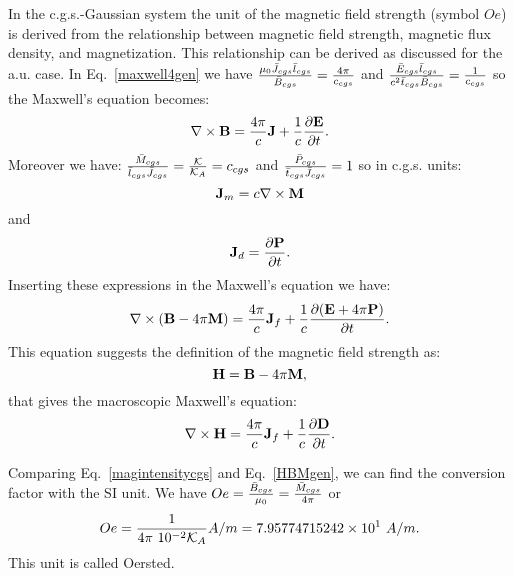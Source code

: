 \documentclass[12pt,a4paper]{article}
\def\htoh{7.95774715242\times 10^{1}}
\begin{document}
{\color{orange} In the c.g.s.-Gaussian system the unit of the magnetic field
strength (symbol $Oe$) is derived from the relationship between 
magnetic field strength,
magnetic flux density, and magnetization. This relationship can be derived
as discussed for the a.u. case. In Eq.~\ref{maxwell4gen} we have
${\mu_0 \bar J_{cgs} \bar l_{cgs} \over \bar B_{cgs}}={4 \pi \over c_{cgs}}$
and ${\bar E_{cgs} \bar l_{cgs} \over c^2 \bar t_{cgs} \bar B_{cgs}}=
{1\over c_{cgs}}$ so the Maxwell's equation becomes:
\begin{equation}
\nabla \times {\bf B}= {4 \pi \over c} {\bf J} + {1\over c} 
{\partial {\bf E} \over \partial t}.
\label{maxwell4cgs}
\end{equation}
Moreover we have:
${\bar M_{cgs} \over \bar l_{cgs} \bar J_{cgs}}={\mathcal{K}\over \mathcal{K}_A}=c_{cgs}$ and
${\bar P_{cgs} \over \bar t_{cgs} \bar J_{cgs}}=1$ so in c.g.s. units:
\begin{equation}
{\bf J}_m= c \nabla \times {\bf M}
\end{equation}
and
\begin{equation}
{\bf J}_d={\partial {\bf P} \over \partial t}.
\end{equation}
Inserting these expressions in the Maxwell's equation we have:
\begin{equation}
\nabla \times ({\bf B} -4\pi {\bf M})= 
{4 \pi\over c} {\bf J}_f +  {1\over c} {\partial ({\bf E}+4\pi {\bf P}) \over \partial t}.
\label{maxwell4cgs1}
\end{equation}
This equation suggests the definition of the magnetic field strength as:
\begin{equation}
{\bf H}={\bf B} -4\pi {\bf M},
\label{magintensitycgs}
\end{equation}
that gives the macroscopic Maxwell's equation:
\begin{equation}
\nabla \times {\bf H}= 
{4 \pi \over c} {\bf J}_f +  {1\over c}{\partial {\bf D} \over \partial t}.
\end{equation}

Comparing Eq.~\ref{magintensitycgs} and Eq.~\ref{HBMgen}, we can find the 
conversion factor with the SI unit.
We have $Oe={\bar B_{cgs} \over \mu_0}={\bar M_{cgs} \over 4 \pi}$ or
\begin{equation}
Oe= {1\over 4 \pi\ 10^{-2} \mathcal{K}_A} A/m=\htoh\ A/m. 
\end{equation}
This unit is called Oersted.
}
\\
\end{document}
